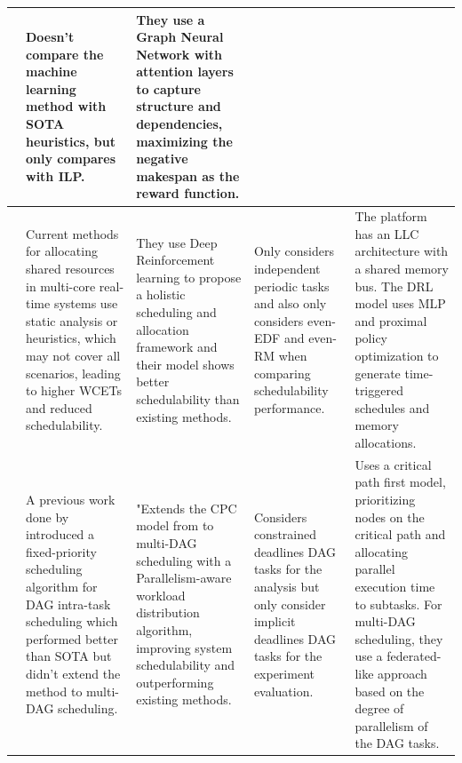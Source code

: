 \begin{table}
\begin{tabular}[]{|p{0.15in}|p{1.6in}|p{1.6in}|p{1.6in}|p{1.6in}|}
         & Doesn't compare the  machine learning 
        method with SOTA heuristics, but only compares with ILP. & They use a Graph Neural Network with attention layers to capture structure and dependencies, 
        maximizing the negative makespan as the reward function.\\
        \hline
        \cite{Xu2023DRLtaskSched} & Current methods for allocating shared resources in multi-core real-time
         systems use static analysis or heuristics, which may not cover all scenarios, leading to higher WCETs and reduced schedulability. & 
        They use Deep Reinforcement learning to propose a holistic scheduling and allocation
        framework and their model shows better schedulability than 
        existing methods. & Only considers independent periodic tasks
        and also only considers even-EDF and even-RM when comparing schedulability performance. &
        The platform has an LLC architecture with a shared memory bus. The DRL model uses MLP and proximal 
        policy optimization to generate time-triggered schedules and memory allocations.\\
        \hline
        \cite{Zhao2022DAGsched} & A previous work done by \citet{zhao2020DAGsched} introduced a fixed-priority scheduling 
        algorithm for DAG intra-task scheduling which performed better 
        than SOTA but didn't extend the method to multi-DAG scheduling. & 
        "Extends the CPC model from \citet{zhao2020DAGsched} to multi-DAG scheduling with a Parallelism-aware workload distribution algorithm, improving system schedulability and outperforming existing methods. & 
        Considers constrained deadlines DAG tasks for the analysis
        but only consider implicit deadlines DAG tasks for the experiment evaluation. & Uses a critical path first model, prioritizing nodes on the critical 
        path and allocating parallel execution time to subtasks. For multi-DAG scheduling, they use a federated-like approach based on the degree of parallelism of the DAG tasks.  \\
        \hline
    \end{tabular}
\end{table}
